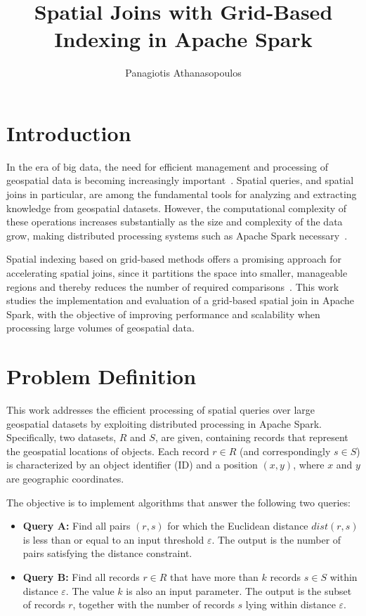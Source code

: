 \documentclass[sigconf,nonacm]{acmart}
\title{Spatial Joins with Grid-Based Indexing in Apache Spark}
\author{Panagiotis Athanasopoulos}
\affiliation{%
  \institution{Department of Digital Systems, University of Piraeus}
  \city{Athens}
  \country{Greece}
}
\begin{document}
\maketitle

\section{Introduction}
In the era of big data, the need for efficient management and processing of geospatial data is becoming increasingly important~\cite{aji2013hadoop}. Spatial queries, and spatial joins in particular, are among the fundamental tools for analyzing and extracting knowledge from geospatial datasets. However, the computational complexity of these operations increases substantially as the size and complexity of the data grow, making distributed processing systems such as Apache Spark necessary~\cite{spatialspark}.

Spatial indexing based on grid-based methods offers a promising approach for accelerating spatial joins, since it partitions the space into smaller, manageable regions and thereby reduces the number of required comparisons~\cite{yu2015geospark}. This work studies the implementation and evaluation of a grid-based spatial join in Apache Spark, with the objective of improving performance and scalability when processing large volumes of geospatial data. 

\section{Problem Definition}
This work addresses the efficient processing of spatial queries over large geospatial datasets by exploiting distributed processing in Apache Spark. Specifically, two datasets, $R$ and $S$, are given, containing records that represent the geospatial locations of objects. Each record $r \in R$ (and correspondingly $s \in S$) is characterized by an object identifier (ID) and a position $(x, y)$, where $x$ and $y$ are geographic coordinates.

The objective is to implement algorithms that answer the following two queries:

\begin{itemize}
    \item \textbf{Query A:} Find all pairs $(r, s)$ for which the Euclidean distance $dist(r, s)$ is less than or equal to an input threshold $\varepsilon$. The output is the number of pairs satisfying the distance constraint.
    \item \textbf{Query B:} Find all records $r \in R$ that have more than $k$ records $s \in S$ within distance $\varepsilon$. The value $k$ is also an input parameter. The output is the subset of records $r$, together with the number of records $s$ lying within distance $\varepsilon$.
\end{itemize}
\end{document}

